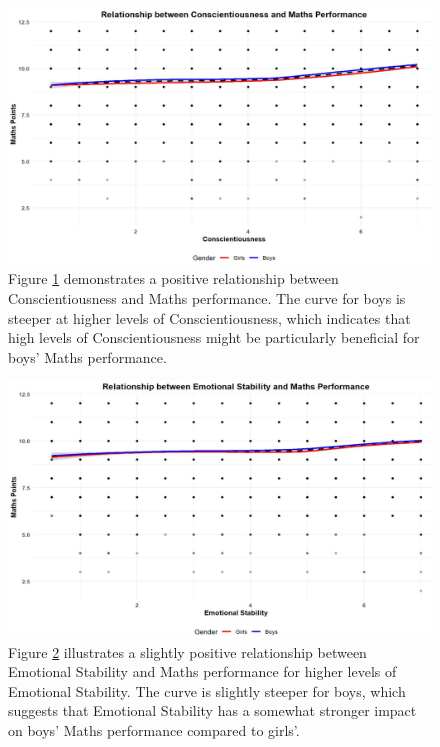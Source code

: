 \documentclass[12pt,a4paper,onecolumn]{article}
\numberwithin{equation}{section}
\begin{document}
\begin{figure}[ht] 
    \centering
    \includegraphics[width=1\linewidth]{production_function_maths_cons.JPG}
    \caption{Figure \ref{fig:con_maths} demonstrates a positive relationship between Conscientiousness and Maths performance. The curve for boys is steeper at higher levels of Conscientiousness, which indicates that high levels of Conscientiousness might be particularly beneficial for boys' Maths performance.}
    \label{fig:con_maths}
\end{figure}

\begin{figure}[ht] 
    \centering
    \includegraphics[width=1\linewidth]{production_function_maths_emostab.JPG}
    \caption{Figure \ref{fig:emostab_maths} illustrates a slightly positive relationship between Emotional Stability and Maths performance for higher levels of Emotional Stability. The curve is slightly steeper for boys, which suggests that Emotional Stability has a somewhat stronger impact on boys' Maths performance compared to girls'.}
    \label{fig:emostab_maths}
\end{figure}
\end{document}
